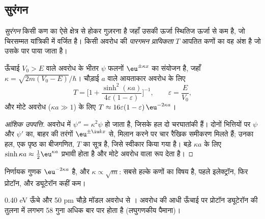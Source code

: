 \subsection*{सुरंगन}

\begin{definition}[सुरंगन, पारगमन प्रायिकता]\label{def:b3:quantum-model-systems:tunnelling}
\emph{सुरंगन} किसी कण का ऐसे क्षेत्र से होकर गुज़रना है
जहाँ उसकी ऊर्जा स्थितिज ऊर्जा से कम है, जो चिरसम्मत यांत्रिकी में
वर्जित है। किसी अवरोध की \emph{पारगमन प्रायिकता}
$T$ आपतित कणों का वह अंश है जो उसके पार
पाया जाता है।
\end{definition}

\begin{proposition}\label{prop:b3:quantum-model-systems:barrier}
ऊँचाई $V_0 > E$ वाले अवरोध के भीतर $\psi$ फलनों
$\eu^{\pm\kappa x}$ का संयोजन है, जहाँ $\kappa = \sqrt{2m(V_0 - E)}/\hbar$। चौड़ाई
$a$ वाले आयताकार अवरोध के लिए
\[
T = \Big[1 + \frac{\sinh^2(\kappa a)}{4\varepsilon(1-\varepsilon)}\Big]^{-1},
\qquad \varepsilon = \frac{E}{V_0},
\]
और मोटे अवरोध ($\kappa a \gg 1$) के लिए $T \approx 16\varepsilon(1-\varepsilon)
\,\eu^{-2\kappa a}$।
\end{proposition}

\begin{proof}[आंशिक उपपत्ति]
अवरोध में  $\psi'' = \kappa^2\psi$ हो जाता है, जिसके
हल दो चरघातांकी हैं। दोनों भित्तियों पर $\psi$ और $\psi'$ का, बाहर की तरंगों
$\eu^{\pm\iu kx}$ से, मिलान करने पर चार रैखिक समीकरण मिलते हैं; उनका
हल, एक पृष्ठ का बीजगणित, $T$ का सूत्र है, जिसे स्वीकार किया गया है।
बड़े $\kappa a$ के लिए $\sinh\kappa a \approx \frac12\eu^{\kappa a}$ प्रभावी होता है और
मोटे अवरोध वाला रूप देता है।
\end{proof}

निर्णायक गुणक $\eu^{-2\kappa a}$ है, और $\kappa \propto \sqrt m$:
 सबसे हल्के कणों का विषय है, पहले इलेक्ट्रॉन, फिर
प्रोटॉन, और ड्यूटेरॉन कहीं कम।

\begin{omfigure}

{\small 0.40 eV ऊँचे और 50 pm चौड़े मॉडल अवरोध से ।
अवरोध की आधी ऊँचाई पर प्रोटॉन ड्यूटेरॉन की तुलना में लगभग 58 गुना
अधिक बार पार होता है (लघुगणकीय पैमाना)।}
\end{omfigure}

